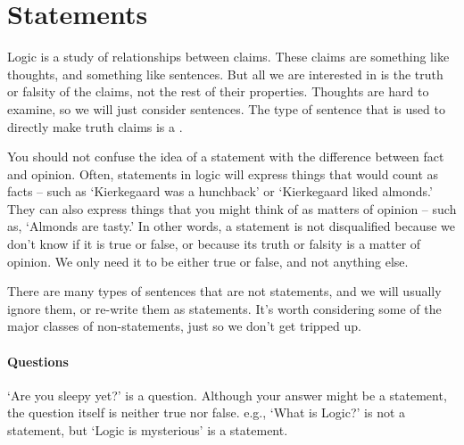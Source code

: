 \documentclass[PHIL101-Textbook.tex]{subfiles}
\begin{document}

\section{Statements}
\label{intro.statements}

Logic is a study of relationships between claims. These claims are something like thoughts, and something like sentences. But all we are interested in is the truth or falsity of the claims, not the rest of their properties. Thoughts are hard to examine, so we will just consider sentences. The type of sentence that is used to directly make truth claims is a .





You should not confuse the idea of a statement with the difference between fact and opinion. Often, statements in logic will express things that would count as facts -- such as `Kierkegaard was a hunchback' or `Kierkegaard liked almonds.' They can also express things that you might think of as matters of opinion -- such as, `Almonds are tasty.' In other words, a statement is not disqualified  because we don't know if it is true or false, or because its truth or falsity is a matter of opinion. We only need it to be either true or false, and not anything else.

There are many types of sentences that are not statements, and we will usually ignore them, or re-write them as statements. It's worth considering some of the major classes of non-statements, just so we don't get tripped up.



\paragraph{Questions} `Are you sleepy yet?' is a question. Although your answer might be a statement, the question itself is neither true nor false.
e.g., `What is Logic?' is not a statement, but `Logic is mysterious' is a statement.
\end{document}
